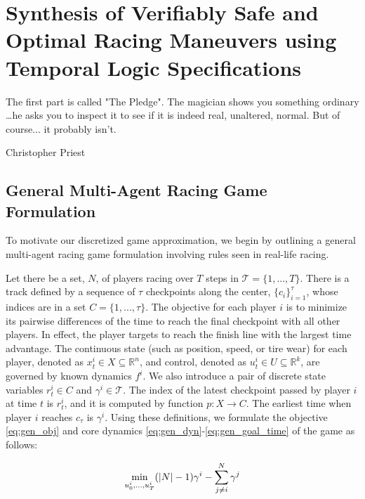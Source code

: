 \chapter{Synthesis of Verifiably Safe and Optimal Racing Maneuvers using Temporal Logic Specifications}
\epigraph{\flushright The first part is called "The Pledge". The magician shows you something ordinary \ldots he asks you to inspect it to see if it is indeed real, unaltered, normal. But of course... it probably isn't.}{Christopher Priest}
\label{chapter:synthesis}
\section{General Multi-Agent Racing Game Formulation} \label{section:genform}
To motivate our discretized game approximation, we begin by outlining a general multi-agent racing game formulation involving rules seen in real-life racing. 

Let there be a set, $N$, of players racing over $T$ steps in $\mathcal{T} = \{1, ..., T\}$. There is a track defined by a sequence of $\tau$ checkpoints along the center, $\{c_i\}_{i=1}^{\tau}$, whose indices are in a set $C=\{1,..., \tau\}$. The objective for each player $i$ is to minimize its pairwise differences of the time to reach the final checkpoint with all other players. In effect, the player targets to reach the finish line with the largest time advantage. The continuous state (such as position, speed, or tire wear) for each player, denoted as $x^i_t \in X \subseteq \mathbb{R}^n$, and control, denoted as $u^i_t \in U \subseteq \mathbb{R}^k$, are governed by known dynamics $f^i$. We also introduce a pair of discrete state variables $r^i_t \in C$ and $\gamma^i \in \mathcal{T}$. The index of the latest checkpoint passed by player $i$ at time $t$ is $r^i_t$, and it is computed by function $p: X\rightarrow C$. The earliest time when player $i$ reaches $c_\tau$ is $\gamma^i$. Using these definitions, we formulate the objective \eqref{eq:gen_obj} and core dynamics \eqref{eq:gen_dyn}-\eqref{eq:gen_goal_time} of the game as follows:

\begin{equation} \label{eq:gen_obj}
    \min_{u^i_0, ..., u^i_T} (|N|-1)\gamma^i - \sum^N_{j \neq i}\gamma^j \\
\end{equation}

